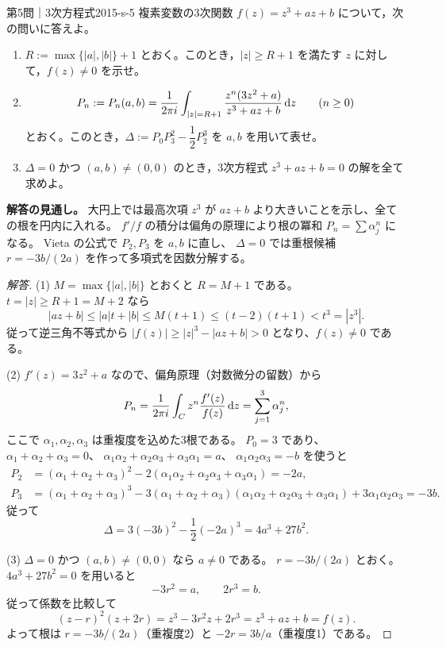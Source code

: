 \begin{problem}{第5問｜3次方程式}{2015-s-5}
複素変数の3次関数 $f(z)=z^3+az+b$ について，次の問いに答えよ。
\begin{enumerate}
  \item[(1)] $R:=\max\{|a|,|b|\}+1$ とおく。このとき，$|z|\ge R+1$ を満たす $z$ に対して，$f(z)\ne0$ を示せ。
  \item[(2)] 
  \[
  P_n:=P_n(a,b)=\frac1{2\pi i}\int_{|z|=R+1}\frac{z^n(3z^2+a)}{z^3+az+b}\,\mathrm{d} z
  \qquad(n\ge0)
  \]
  とおく。このとき，$\Delta:=P_0P_3^2-\dfrac12P_2^3$ を $a,b$ を用いて表せ。
  \item[(3)] $\Delta=0$ かつ $(a,b)\ne(0,0)$ のとき，3次方程式 $z^3+az+b=0$ の解を全て求めよ。
\end{enumerate}
\end{problem}
\begin{memo*}
\textbf{解答の見通し。}
大円上では最高次項 $z^3$ が $az+b$ より大きいことを示し、全ての根を円内に入れる。
$f'/f$ の積分は偏角の原理により根の冪和 $P_n=\sum\alpha_j^n$ になる。
Vieta の公式で $P_2,P_3$ を $a,b$ に直し、
$\Delta=0$ では重根候補 $r=-3b/(2a)$ を作って多項式を因数分解する。
\end{memo*}
\begin{proof}[解答]
(1) $M=\max\{|a|,|b|\}$ とおくと $R=M+1$ である。$t=|z|\ge R+1=M+2$ なら
\[
|az+b|\le |a|t+|b|\le M(t+1)\le(t-2)(t+1)<t^3=|z^3|.
\]
従って逆三角不等式から
$|f(z)|\ge |z|^3-|az+b|>0$ となり、$f(z)\ne0$ である。

(2) $f'(z)=3z^2+a$ なので、偏角原理（対数微分の留数）から
\[
P_n=\frac1{2\pi i}\int_Cz^n\frac{f'(z)}{f(z)}\,\mathrm{d} z
=\sum_{j=1}^3\alpha_j^n,
\]
ここで $\alpha_1,\alpha_2,\alpha_3$ は重複度を込めた3根である。
$P_0=3$ であり、$\alpha_1+\alpha_2+\alpha_3=0$、
$\alpha_1\alpha_2+\alpha_2\alpha_3+\alpha_3\alpha_1=a$、
$\alpha_1\alpha_2\alpha_3=-b$ を使うと
\begin{align*}
P_2&=(\alpha_1+\alpha_2+\alpha_3)^2
-2(\alpha_1\alpha_2+\alpha_2\alpha_3+\alpha_3\alpha_1)=-2a,\\
P_3&=(\alpha_1+\alpha_2+\alpha_3)^3
-3(\alpha_1+\alpha_2+\alpha_3)
(\alpha_1\alpha_2+\alpha_2\alpha_3+\alpha_3\alpha_1)
+3\alpha_1\alpha_2\alpha_3=-3b.
\end{align*}
従って
\[
\Delta=3(-3b)^2-\frac12(-2a)^3=4a^3+27b^2.
\]

(3) $\Delta=0$ かつ $(a,b)\ne(0,0)$ なら $a\ne0$ である。
$r=-3b/(2a)$ とおく。$4a^3+27b^2=0$ を用いると
\[
-3r^2=a,\qquad 2r^3=b.
\]
従って係数を比較して
\[
(z-r)^2(z+2r)=z^3-3r^2z+2r^3=z^3+az+b=f(z).
\]
よって根は $r=-3b/(2a)$（重複度2）と $-2r=3b/a$（重複度1）である。
\end{proof}


